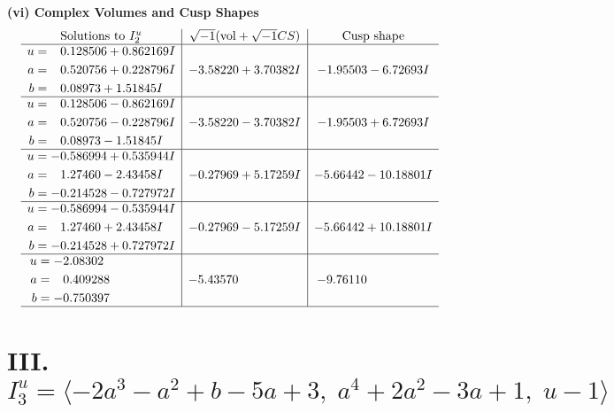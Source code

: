 \documentclass[1p]{elsarticle_modified}
\theoremstyle{definition}
\newcommand{\I}{\sqrt{-1}}
\begin{document}
\newpage\flushleft \textbf{(vi) Complex Volumes and Cusp Shapes}
$$\begin{array}{c|c|c}  
\text{Solutions to }I^u_{2}& \I (\text{vol} + \sqrt{-1}CS) & \text{Cusp shape}\\
 \hline 
\begin{aligned}
u &= \phantom{-}0.128506 + 0.862169 I \\
a &= \phantom{-}0.520756 + 0.228796 I \\
b &= \phantom{-}0.08973 + 1.51845 I\end{aligned}
 & -3.58220 + 3.70382 I & -1.95503 - 6.72693 I \\ \hline\begin{aligned}
u &= \phantom{-}0.128506 - 0.862169 I \\
a &= \phantom{-}0.520756 - 0.228796 I \\
b &= \phantom{-}0.08973 - 1.51845 I\end{aligned}
 & -3.58220 - 3.70382 I & -1.95503 + 6.72693 I \\ \hline\begin{aligned}
u &= -0.586994 + 0.535944 I \\
a &= \phantom{-}1.27460 - 2.43458 I \\
b &= -0.214528 - 0.727972 I\end{aligned}
 & -0.27969 + 5.17259 I & -5.66442 - 10.18801 I \\ \hline\begin{aligned}
u &= -0.586994 - 0.535944 I \\
a &= \phantom{-}1.27460 + 2.43458 I \\
b &= -0.214528 + 0.727972 I\end{aligned}
 & -0.27969 - 5.17259 I & -5.66442 + 10.18801 I \\ \hline\begin{aligned}
u &= -2.08302\phantom{ +0.000000I} \\
a &= \phantom{-}0.409288\phantom{ +0.000000I} \\
b &= -0.750397\phantom{ +0.000000I}\end{aligned}
 & -5.43570\phantom{ +0.000000I} & -9.76110\phantom{ +0.000000I}\\
 \hline 
 \end{array}$$\newpage\newpage\renewcommand{\arraystretch}{1}
\centering \section*{III. $I^u_{3}= \langle -2 a^3- a^2+b-5 a+3,\;a^4+2 a^2-3 a+1,\;u-1 \rangle$}
\end{document}
